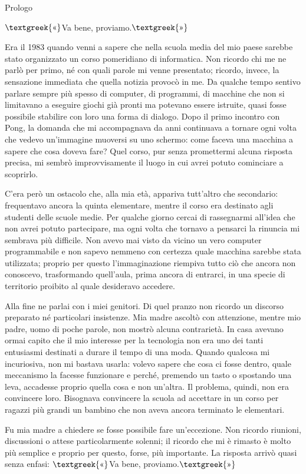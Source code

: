 \documentclass{article}
\author{utente}
\date{2026-08-18}
\begin{document}
Prologo

$\text{\textgreek{«}}$Va bene, proviamo.$\text{\textgreek{»}}$

Era il 1983 quando venni a sapere che nella scuola media del mio paese sarebbe stato organizzato un corso pomeridiano di
informatica. Non ricordo chi me ne parlò per primo, né con quali parole mi venne presentato; ricordo, invece, la
sensazione immediata che quella notizia provocò in me. Da qualche tempo sentivo parlare sempre più spesso di computer,
di programmi, di macchine che non si limitavano a eseguire giochi già pronti ma potevano essere istruite, quasi fosse
possibile stabilire con loro una forma di dialogo. Dopo il primo incontro con Pong, la domanda che mi accompagnava da
anni continuava a tornare ogni volta che vedevo un'immagine muoversi su uno schermo: come faceva una macchina a sapere
che cosa doveva fare? Quel corso, pur senza promettermi alcuna risposta precisa, mi sembrò improvvisamente il luogo in
cui avrei potuto cominciare a scoprirlo.

C'era però un ostacolo che, alla mia età, appariva tutt'altro che secondario: frequentavo ancora la quinta elementare,
mentre il corso era destinato agli studenti delle scuole medie. Per qualche giorno cercai di rassegnarmi all'idea che
non avrei potuto partecipare, ma ogni volta che tornavo a pensarci la rinuncia mi sembrava più difficile. Non avevo mai
visto da vicino un vero computer programmabile e non sapevo nemmeno con certezza quale macchina sarebbe stata
utilizzata; proprio per questo l'immaginazione riempiva tutto ciò che ancora non conoscevo, trasformando quell'aula,
prima ancora di entrarci, in una specie di territorio proibito al quale desideravo accedere.

Alla fine ne parlai con i miei genitori. Di quel pranzo non ricordo un discorso preparato né particolari insistenze. Mia
madre ascoltò con attenzione, mentre mio padre, uomo di poche parole, non mostrò alcuna contrarietà. In casa avevano
ormai capito che il mio interesse per la tecnologia non era uno dei tanti entusiasmi destinati a durare il tempo di una
moda. Quando qualcosa mi incuriosiva, non mi bastava usarla: volevo sapere che cosa ci fosse dentro, quale meccanismo
la facesse funzionare e perché, premendo un tasto o spostando una leva, accadesse proprio quella cosa e non un'altra.
Il problema, quindi, non era convincere loro. Bisognava convincere la scuola ad accettare in un corso per ragazzi più
grandi un bambino che non aveva ancora terminato le elementari.

Fu mia madre a chiedere se fosse possibile fare un'eccezione. Non ricordo riunioni, discussioni o attese particolarmente
solenni; il ricordo che mi è rimasto è molto più semplice e proprio per questo, forse, più importante. La risposta
arrivò quasi senza enfasi: $\text{\textgreek{«}}$Va bene, proviamo.$\text{\textgreek{»}}$
\end{document}
